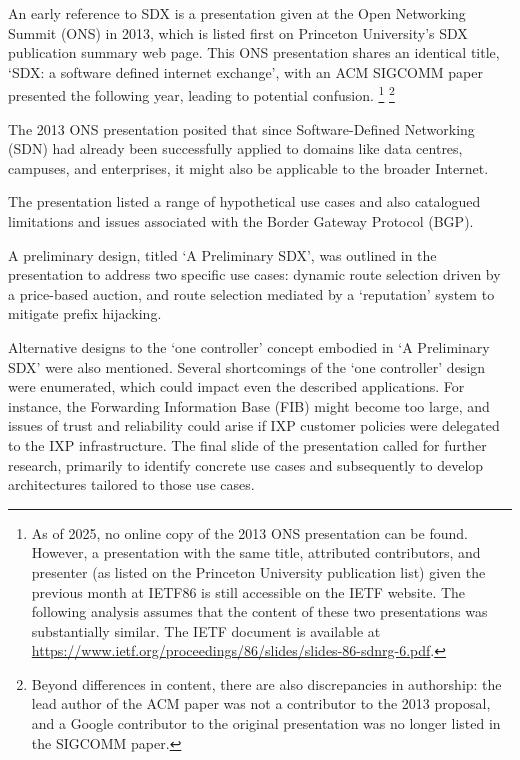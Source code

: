 An early reference to SDX is a presentation given at the Open Networking Summit (ONS) in 2013, which is listed first on Princeton University's SDX publication summary web page. This ONS presentation shares an identical title, `SDX: a software defined internet exchange', with an ACM SIGCOMM paper presented the following year, leading to potential confusion.
\footnote{
As of 2025, no online copy of the 2013 ONS presentation can be found.
However, a presentation with the same title, attributed contributors, and presenter (as listed on the Princeton University publication list) given the previous month at IETF86 is still accessible on the IETF website. The following analysis assumes that the content of these two presentations was substantially similar.
The IETF document is available at \url{https://www.ietf.org/proceedings/86/slides/slides-86-sdnrg-6.pdf}.
}
\footnote{Beyond differences in content, there are also discrepancies in authorship: the lead author of the ACM paper was not a contributor to the 2013 proposal, and a Google contributor to the original presentation was no longer listed in the SIGCOMM paper.}

The 2013 ONS presentation posited that since Software-Defined Networking (SDN) had already been successfully applied to domains like data centres, campuses, and enterprises, it might also be applicable to the broader Internet.

The presentation listed a range of hypothetical use cases and also catalogued limitations and issues associated with the Border Gateway Protocol (BGP).

\bigskip


A preliminary design, titled `A Preliminary SDX', was outlined in the presentation to address two specific use cases: dynamic route selection driven by a price-based auction, and route selection mediated by a `reputation' system to mitigate prefix hijacking.

Alternative designs to the `one controller' concept embodied in `A Preliminary SDX' were also mentioned. Several shortcomings of the `one controller' design were enumerated, which could impact even the described applications. For instance, the Forwarding Information Base (FIB) might become too large, and issues of trust and reliability could arise if IXP customer policies were delegated to the IXP infrastructure. The final slide of the presentation called for further research, primarily to identify concrete use cases and subsequently to develop architectures tailored to those use cases.

